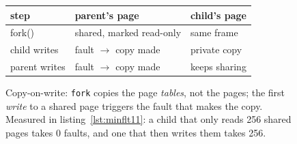 \begin{figure}[htbp]
\centering
\begin{tabular}{lll}
\toprule
step & parent's page & child's page \\
\midrule
fork()        & shared, marked read-only & same frame \\
child writes  & fault $\to$ copy made    & private copy \\
parent writes & fault $\to$ copy made    & keeps sharing \\
\bottomrule
\end{tabular}
\caption{Copy-on-write: \texttt{fork} copies the page \emph{tables},
not the pages; the first \emph{write} to a shared page triggers the
fault that makes the copy. Measured in listing~\ref{lst:minflt11}: a child
that only reads 256 shared pages takes 0 faults, and one that then
writes them takes 256.}
\label{fig:cow11}
\end{figure}
